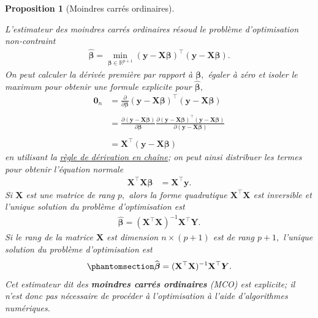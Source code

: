 \documentclass[
  11pt,
  letterpaper,
]{scrbook}
\theoremstyle{plain}
\newtheorem{proposition}{Proposition}[chapter]
\theoremstyle{plain}
\theoremstyle{definition}
\theoremstyle{definition}
\theoremstyle{remark}
\begin{document}
\begin{proposition}[Moindres carrés
ordinaires]\protect\hypertarget{prp-ols-mle}{}\label{prp-ols-mle}

L'estimateur des moindres carrés ordinaires résoud le problème
d'optimisation non-contraint \begin{align*}
\widehat{\boldsymbol{\beta}}=\min_{\boldsymbol{\beta} \in \mathbb{R}^{p+1}}(\boldsymbol{y}-\mathbf{X}\boldsymbol{\beta})^\top(\boldsymbol{y}-\mathbf{X}\boldsymbol{\beta}).
\end{align*} On peut calculer la dérivée première par rapport à
\(\boldsymbol{\beta},\) égaler à zéro et isoler le maximum pour obtenir
une formule explicite pour \(\widehat{\boldsymbol{\beta}},\)
\begin{align*}
\mathbf{0}_n&=\frac{\partial}{\partial\boldsymbol{\beta}}(\boldsymbol{y}-\mathbf{X}\boldsymbol{\beta})^\top(\boldsymbol{y}-\mathbf{X}\boldsymbol{\beta})\\
\\&=\frac{\partial (\boldsymbol{y}-\mathbf{X}\boldsymbol{\beta})}{\partial \boldsymbol{\beta}}\frac{\partial (\boldsymbol{y}-\mathbf{X}\boldsymbol{\beta})^\top(\boldsymbol{y}-\mathbf{X}\boldsymbol{\beta})}{\partial (\boldsymbol{y}-\mathbf{X}\boldsymbol{\beta})}\\
 \\&=\mathbf{X}^\top (\boldsymbol{y}-\mathbf{X}\boldsymbol{\beta})
\end{align*} en utilisant la
\href{http://www.stat.rice.edu/~dobelman/notes_papers/math/Matrix.Calculus.AppD.pdf}{règle
de dérivation en chaîne}; on peut ainsi distribuer les termes pour
obtenir l'\emph{équation normale} \begin{align*}
 \mathbf{X}^\top \mathbf{X}\boldsymbol{\beta}&=\mathbf{X}^\top \boldsymbol{y}.
\end{align*} Si \(\mathbf{X}\) est une matrice de rang \(p,\) alors la
forme quadratique \(\mathbf{X}^\top \mathbf{X}\) est inversible et
l'unique solution du problème d'optimisation est \begin{align*}
\widehat{\boldsymbol{\beta}} = (\mathbf{X}^{\top} \mathbf{X})^{-1} \mathbf{X}^{\top} \boldsymbol{Y}.
\end{align*} Si le rang de la matrice \(\mathbf{X}\) est dimension
\(n \times (p+1)\) est de rang \(p+1,\) l'unique solution du problème
d'optimisation est \begin{equation}\phantomsection\label{eq-ols}{
\widehat{\boldsymbol{\beta}} = (\mathbf{X}^{\top} \mathbf{X})^{-1} \mathbf{X}^{\top} \boldsymbol{Y}.
}\end{equation} Cet estimateur dit des \textbf{moindres carrés
ordinaires} (MCO) est explicite; il n'est donc pas nécessaire de
procéder à l'optimisation à l'aide d'algorithmes numériques.

\end{proposition}
\end{document}
